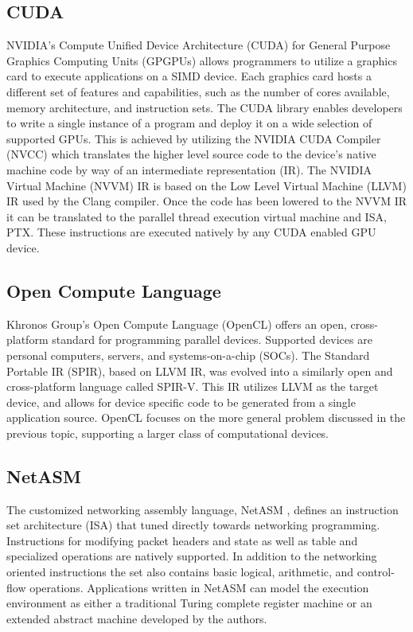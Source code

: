 \subsection{CUDA}
\label{related:cuda}
NVIDIA's Compute Unified Device Architecture (CUDA) \cite{cuda} for General
Purpose Graphics Computing Units (GPGPUs) allows programmers to utilize a
graphics card to execute applications on a SIMD device. Each graphics card
hosts a different set of features and capabilities, such as the number of cores
available, memory architecture, and instruction sets. The CUDA library
enables developers to write a single instance of a program and deploy
it on a wide selection of supported GPUs. This is achieved by utilizing the
NVIDIA CUDA Compiler (NVCC) which translates the higher level source code
to the device's native machine code by way of an intermediate representation
(IR). The NVIDIA Virtual Machine (NVVM) IR is based on the Low Level Virtual
Machine (LLVM) IR used by the Clang compiler. Once the code has been lowered
to the NVVM IR it can be translated to the parallel thread execution virtual
machine and ISA, PTX. These instructions are executed natively by any CUDA
enabled GPU device.

\subsection{Open Compute Language}
\label{related:ocl}
Khronos Group's Open Compute Language (OpenCL) \cite{opencl} offers an open,
cross-platform standard for programming parallel devices. Supported devices are
personal computers, servers, and systems-on-a-chip (SOCs). The Standard
Portable IR (SPIR), based on LLVM IR, was evolved into a similarly open and
cross-platform language called SPIR-V. This IR utilizes LLVM as the target
device, and allows for device specific code to be generated from a single
application source. OpenCL focuses on the more general problem discussed in
the previous topic, supporting a larger class of computational devices.

\subsection{NetASM}
\label{related:netasm}
The customized networking assembly language, NetASM \cite{netasm}, defines an
instruction set architecture (ISA) that tuned directly towards networking
programming. Instructions for modifying packet headers and state as well
as table and specialized operations are natively supported. In addition to the
networking oriented instructions the set also contains basic logical,
arithmetic, and control-flow operations. Applications written in NetASM can
model the execution environment as either a traditional Turing complete
register machine or an extended abstract machine developed by the authors.

